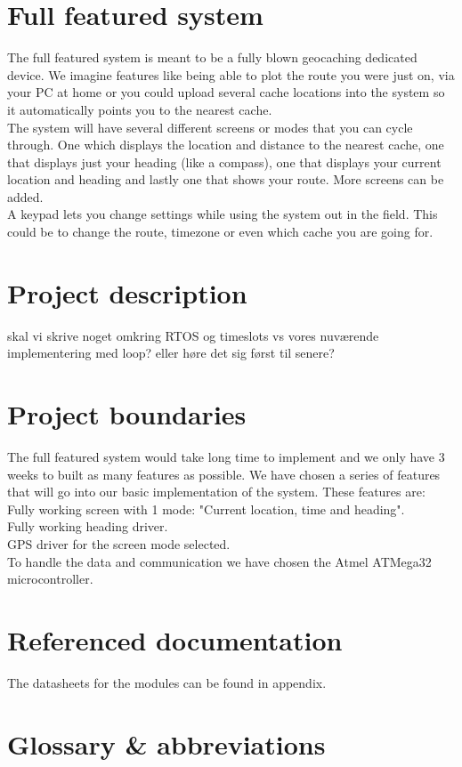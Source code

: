 \section{Full featured system}

The full featured system is meant to be a fully blown geocaching dedicated device. We imagine features like being able to plot the route you were just on, via your PC at home or you could upload several cache locations into the system so it automatically points you to the nearest cache.\\
The system will have several different screens or modes that you can cycle through. One which displays the location and distance to the nearest cache, one that displays just your heading (like a compass), one that displays your current location and heading and lastly one that shows your route. More screens can be added. \\
A keypad lets you change settings while using the system out in the field. This could be to change the route, timezone or even which cache you are going for.\\


\section{Project description}

skal vi skrive noget omkring RTOS og timeslots vs vores nuværende implementering med loop? eller høre det sig først til senere?

\section{Project boundaries}
The full featured system would take long time to implement and we only have 3 weeks to built as many features as possible. We have chosen a series of features that will go into our basic implementation of the system. These features are:
Fully working screen with 1 mode: "Current location, time and heading".\\
Fully working heading driver.\\
GPS driver for the screen mode selected. \\
To handle the data and communication we have chosen the Atmel ATMega32 microcontroller.\\

\section{Referenced documentation}
The datasheets for the modules can be found in appendix.

\section{Glossary \& abbreviations}








